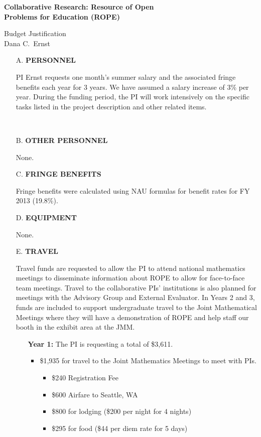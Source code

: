 \documentclass[11pt]{article}
\begin{document}
\begin{center}
{\Large \textbf{Collaborative Research: Resource of Open\\
Problems for Education (ROPE)}}

\bigskip

{\Large Budget Justification}\\
\smallskip
Dana C.~Ernst
\end{center}

\begin{enumerate}[leftmargin=*]

\item[A.] \textbf{PERSONNEL}

PI Ernst requests one month's summer salary and the associated fringe benefits each year for 3 years. We have assumed a salary increase of 3\% per year.  During the funding period, the PI will work intensively on the specific tasks listed in the project description and other related items. 

\ \hfill {}

\item[B.] \textbf{OTHER PERSONNEL}

None. \hfill {}

\item[C.] \textbf{FRINGE BENEFITS}

Fringe benefits were calculated using NAU formulas for benefit rates for FY 2013 (19.8\%).

\hfill {}

\item[D.] \textbf{EQUIPMENT}

None. \hfill {}

\item[E.] \textbf{TRAVEL}

Travel funds are requested to allow the PI to attend national mathematics meetings to disseminate information about ROPE to allow for face-to-face team meetings.  Travel to the collaborative PIs' institutions is also planned for meetings with the Advisory Group and External Evaluator. In Years 2 and 3, funds are included to support undergraduate travel to the Joint Mathematical Meetings where they will have a demonstration of ROPE and help staff our booth in the exhibit area at the JMM.

\begin{enumerate}
\item[] \textbf{Year 1:} The PI is requesting a total of \$3,611.
\begin{itemize}
\item \$1,935 for travel to the Joint Mathematics Meetings to meet with PIs.
\begin{itemize}
\item \$240 Registration Fee
\item \$600 Airfare to Seattle, WA
\item \$800 for lodging (\$200 per night for 4 nights)
\item \$295 for food (\$44 per diem rate for 5 days)
\end{itemize}


\end{itemize}
\end{enumerate}
\end{enumerate}
\end{document}

